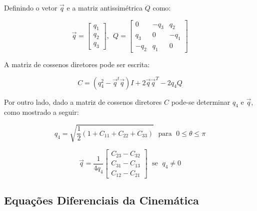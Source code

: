 Definindo o vetor \begin{math}\vec{q} \end{math} e a matriz antissimétrica \begin{math}Q \end{math} como:

\begin{equation}\vec{q}=\begin{bmatrix}
q_1 \\ q_2 \\ q_3
\end{bmatrix}\text{,	} \; Q=\begin{bmatrix}
0 & -q_3 & q_2 \\ q_3 & 0 & -q_1 \\ -q_2 & q_1 & 0
\end{bmatrix}\end{equation}

A matriz de cossenos diretores pode ser escrita:

\begin{equation}C=(q_4^2-\vec{q}^t\vec{q})I+2\vec{q}\vec{q}^T-2q_ 4Q\end{equation}

Por outro lado, dado a matriz de cossenos diretores \begin{math}C\end{math} pode-se determinar \begin{math}q_4\end{math} e \begin{math}\vec{q}\end{math}, como mostrado a seguir:

\begin{equation}q_4=\sqrt{\frac{1}{2}(1+C_{11}+C_{22}+C_{33})}\; \text{ para }\; 0\leq \theta\leq \pi\end{equation}

\begin{equation}\vec{q}=\frac{1}{4q_4}\begin{bmatrix}C_{23}-C_{32} \\ C_{31}-C_{13} \\ C_{12}-C_{21}\end{bmatrix}\;\text{ se }\;q_4\neq 0\end{equation}

\subsection{Equações Diferenciais da Cinemática}\label{sec:3.1.2.5}

